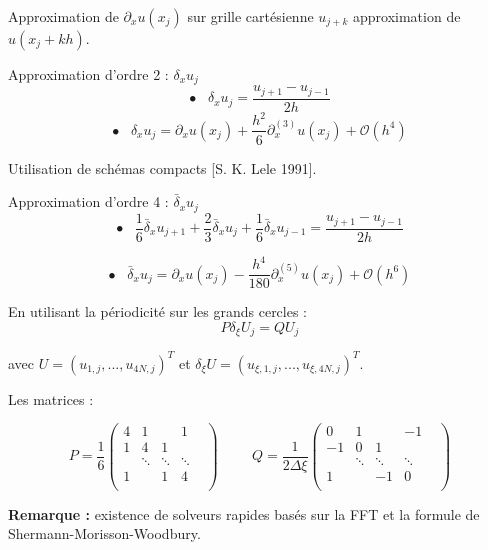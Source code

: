 \documentclass[11pt]{beamer}
\begin{document}
\begin{frame}{Approximation de $\partial_x u(x_j)$ sur grille cartésienne}
$u_{j+k}$ approximation de $u(x_j + k h)$.
\begin{block}{Approximation d'ordre 2 : $\delta_x u_j$}
\begin{equation*}
\bullet \;\;\; \delta_x u_j = \dfrac{u_{j+1}- u_{j-1}}{2h}
\end{equation*}
\begin{equation*}
\bullet \;\;\; \delta_x u_j = \partial_x u(x_j) + \dfrac{h^2}{6} \partial^{(3)}_x u(x_j) + \mathcal{O}\left( h^4 \right)
\end{equation*}
\end{block}

\pause
Utilisation de schémas compacts [S. K. Lele 1991].

\begin{block}{Approximation d'ordre 4 : $\bar{\delta}_x u_j$}
\begin{equation*}
\bullet \;\;\; \dfrac{1}{6}\bar{\delta}_x u_{j+1}+\dfrac{2}{3}\bar{\delta}_x u_{j} + \dfrac{1}{6}\bar{\delta}_x u_{j-1} = \dfrac{u_{j+1}- u_{j-1}}{2h}
\end{equation*}

\begin{equation*}
\bullet \;\;\; \bar{\delta}_x u_{j} = \partial_x u(x_j) - \dfrac{h^4}{180} \partial^{(5)}_x u (x_j) + \mathcal{O}\left( h^6 \right)
\end{equation*}
\end{block}
\end{frame}

\begin{frame}
En utilisant la périodicité sur les grands cercles :
\begin{equation}
P \delta_{\xi}U_j = Q U_j
\end{equation}

avec $U=(u_{1,j}, ..., u_{4N,j})^T$ et $\delta_{\xi} U=(u_{\xi,1,j}, ..., u_{\xi,4N,j})^T$.

Les matrices :

\begin{equation*}
P=\dfrac{1}{6}\begin{pmatrix}
4 & 1 &   &   1 \\
1 &4 &1&       \\
    & \ddots & \ddots &  \ddots & \\
1 &        &    1 & 4\\
\end{pmatrix} \hspace{1cm} Q=\dfrac{1}{2 \Delta \xi}\begin{pmatrix}
0 & 1 &   &   -1 \\
-1 &0 &1&       \\
    & \ddots & \ddots &  \ddots & \\
1 &        &    -1 & 0\\
\end{pmatrix}
\end{equation*}

\textbf{Remarque :} existence de solveurs rapides basés sur la FFT et la formule de Shermann-Morisson-Woodbury.

\end{frame}
\end{document}
